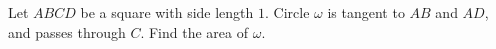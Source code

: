 Let $ABCD$ be a square with side length $1$. Circle $\omega$ is tangent to $AB$ and $AD$, and passes through $C$. Find the area of $\omega$.
